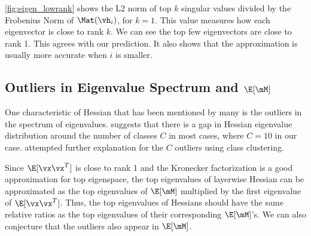 \cref{fig:eigen_lowrank} shows the L2 norm of top $k$ singular values divided by the Frobenius Norm of $\Mat(\vh_i)$, for $k = 1$. This value measures how each eigenvector is close to rank $k$. We can see the top few eigenvectors are close to rank 1. This agrees with our prediction. It also shows that the approximation is usually more accurate when $i$ is smaller.


\subsection{Outliers in Eigenvalue Spectrum and \texorpdfstring{$\E[\mM]$}{EM}}
\label{sec:emp_outlier}
One characteristic of Hessian that has been mentioned by many is the outliers in the spectrum of eigenvalues. \citet{sagun2017empirical} suggests that there is a gap in Hessian eigenvalue distribution around the number of classes $C$ in most cases, where $C=10$ in our case. \citet{papyan2019measurements} attempted further explanation for the $C$ outliers using class clustering. 

Since $\E[\vx\vx^T]$ is close to rank 1 and the Kronecker factorization is a good approximation for top eigenspace, the top eigenvalues of layerwise Hessian can be approximated as the top eigenvalues of $\E[\mM]$ multiplied by the first eigenvalue of $\E[\vx\vx^T]$. Thus, the top eigenvalues of Hessians should have the same relative ratios as the top eigenvalues of their corresponding $\E[\mM]$'s. We can also conjecture that the outliers also appear in $\E[\mM]$.

